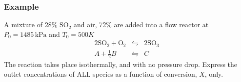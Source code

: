 \begin{frame}\frametitle{Example}
	A mixture of 28\% $\text{SO}_2$ and air, 72\% are added into a flow reactor at $P_0 = 1485\,\text{kPa}$ and $T_0 = 500K$
	$$\begin{array}{rcl}
		2\text{SO}_2 + \text{O}_2 &\leftrightharpoons& 2\text{SO}_3  \\
		A + \frac{1}{2}B &\leftrightharpoons& C
	\end{array} 
	$$
	The reaction takes place isothermally, and with no pressure drop. Express the outlet concentrations of ALL species as a function of conversion, $X$, only.
	
	\vspace{12pt}
	{\color{myOrange}{Use the table provided to lay out your answer.}}
\end{frame}